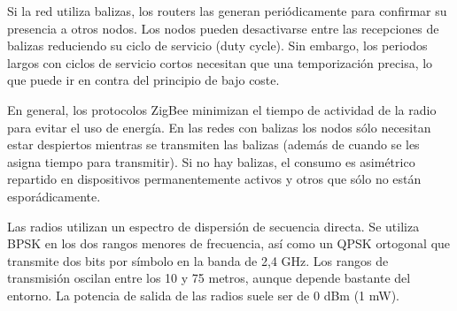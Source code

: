 Si la red utiliza balizas, los routers las generan peri\'odicamente para confirmar su presencia a otros nodos. Los nodos
pueden desactivarse entre las recepciones de balizas reduciendo su ciclo de servicio (duty cycle). Sin embargo, los
periodos largos con ciclos de servicio cortos necesitan que una temporizaci\'on precisa, lo que puede ir en contra del
principio de bajo coste.

En general, los protocolos ZigBee minimizan el tiempo de actividad de la radio para evitar el uso de energ\'ia. En las
redes con balizas los nodos s\'olo necesitan estar despiertos mientras se transmiten las balizas (adem\'as de cuando se les
asigna tiempo para transmitir). Si no hay balizas, el consumo es asim\'etrico repartido en dispositivos permanentemente
activos y otros que s\'olo no est\'an espor\'adicamente.

Las radios utilizan un espectro de dispersi\'on de secuencia directa. Se utiliza BPSK en los dos rangos menores de
frecuencia, as\'i como un QPSK ortogonal que transmite dos bits por s\'imbolo en la banda de 2,4 GHz. Los rangos de
transmisi\'on oscilan entre los 10 y 75 metros, aunque depende bastante del entorno. La potencia de salida de las radios
suele ser de 0 dBm (1 mW).

